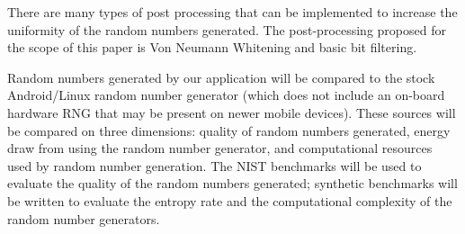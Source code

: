 

There are many types of post processing that can be implemented to increase the
uniformity of the random numbers generated. The post-processing proposed for the
scope of this paper is Von Neumann Whitening \cite{vn_whitening} and basic bit
filtering. 


 
Random numbers generated by our application will be compared to the stock
Android/Linux random number generator (which does not include an on-board
hardware RNG that may be present on newer mobile devices).  These sources will
be compared on three dimensions: quality of random numbers generated, energy
draw from using the random number generator, and computational resources used by
random number generation.  The NIST \cite{nist} benchmarks will be used to
evaluate the quality of the random numbers generated; synthetic benchmarks will
be written to evaluate the entropy rate and the computational complexity of the
random number generators.
